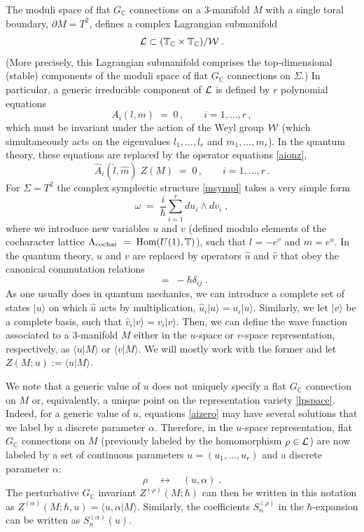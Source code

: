 \documentclass[hyper]{JHEP3}
\def\CL {{\cal L}}
\def\CW {{\cal W}}
\def\TT{{\Bbb{T}}}
\newcommand{\C}{{\mathbb{C}}}
\newcommand\be{\begin{equation}}
\newcommand\ee{\end{equation}}
\def\={\;=\;}
\begin{document}
The moduli space of flat $G_{\C}$ connections on a 3-manifold $M$ with a single
toral boundary, $\partial M = T^2$, defines a complex Lagrangian submanifold
\be
\CL \subset ( \TT_{\C} \times \TT_{\C} ) / \CW\;.
\ee
(More precisely, this Lagrangian submanifold comprises the top-dimensional
(stable) components of the moduli space of flat $G_{\C}$ connections on $\Sigma$.)
In particular, a generic irreducible component of $\CL$
is defined by $r$ polynomial equations
\be
A_i (l,m) \= 0\,, \qquad i = 1, \ldots, r\,,
\label{aizero}
\ee
which must be invariant under the action of the Weyl group $\CW$
(which simultaneously acts on the eigenvalues $l_1, \ldots, l_r$ and $m_1, \ldots, m_r$).
In the quantum theory, these equations are replaced by the operator equations \eqref{aionz},
\be
\widehat{A}_i (\hat l, \hat m )\;Z (M) \= 0\,, \qquad i = 1, \ldots, r\,.
\label{almonz}
\ee
For $\Sigma = T^2$ the complex symplectic structure \eqref{msympl}
takes a very simple form
\be
\omega \= \frac{i}{\hbar} \sum_{i=1}^r du_i \wedge dv_i\;,
\label{sympluv}
\ee
where we introduce new variables $u$ and $v$
(defined modulo elements of the cocharacter lattice
$\Lambda_{{\rm cochar}} \= {\rm Hom} (U(1),\TT)$),
such that $l = - e^v$ and $m = e^u$.
In the quantum theory, $u$ and $v$ are replaced by operators $\hat u$ and $\hat v$
that obey the canonical commutation relations
\be
[\hat u_i , \hat v_j ] \= - \hbar \delta_{ij}\;.
\label{uvcomm}
\ee
As one usually does in quantum mechanics, we can introduce a complete
set of states $\vert u \rangle$ on which $\hat u$ acts by multiplication,
$\hat u_i \vert u \rangle = u_i \vert u \rangle$.
Similarly, we let $\vert v \rangle$ be a complete basis,
such that $\hat v_i \vert v \rangle = v_i \vert v \rangle$.
Then, we can define the wave function associated to
a 3-manifold $M$ either in the $u$-space or $v$-space representation,
respectively, as $\langle u \vert M \rangle$ or $\langle v \vert M \rangle$.
We will mostly work with the former and let $Z(M;u) := \langle u \vert M \rangle$.

We note that a generic value of $u$ does not uniquely specify
a flat $G_{\C}$ connection on $M$ or, equivalently, a unique point on the representation
variety \eqref{lpspace}.
Indeed, for a generic value of $u$, equations \eqref{aizero}
may have several solutions that we label by a discrete parameter $\alpha$.
Therefore, in the $u$-space representation, flat $G_{\C}$ connections on $M$
(previously labeled by the homomorphism $\rho \in \CL$)
are now labeled by a set of continuous parameters $u = (u_1, \ldots, u_r)$
and a discrete parameter $\alpha$:
\be
\rho \quad \longleftrightarrow \quad (u,\alpha)\;.
\label{rhoviaua}
\ee
The perturbative $G_{\C}$ invariant $Z^{(\rho)} (M;\hbar)$
can then be written in this notation as
$Z^{(\alpha)} (M;\hbar,u) = \langle u, \alpha \vert M \rangle$.
Similarly, the coefficients $S^{(\rho)}_n$ in the $\hbar$-expansion
can be written as $S^{(\alpha)}_n (u)$.
\end{document}
